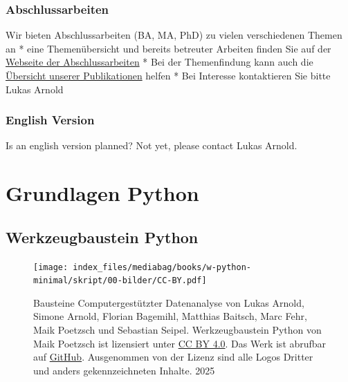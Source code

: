 \documentclass[
  letterpaper,
  DIV=11,
  numbers=noendperiod]{scrreprt}
\begin{document}
\section*{Abschlussarbeiten}\label{abschlussarbeiten}


Wir bieten Abschlussarbeiten (BA, MA, PhD) zu vielen verschiedenen
Themen an * eine Themenübersicht und bereits betreuter Arbeiten finden
Sie auf der
\href{https://cce.uni-wuppertal.de/de/abschlussarbeiten/}{Webseite der
Abschlussarbeiten} * Bei der Themenfindung kann auch die
\href{https://www.fz-juelich.de/en/ias/ias-7/profiles/arnold-lukas/journal-articles}{Übersicht
unserer Publikationen} helfen * Bei Interesse kontaktieren Sie bitte
Lukas Arnold

\section*{English Version}\label{english-version}


Is an english version planned? Not yet, please contact Lukas Arnold.

\part{Grundlagen Python}

\chapter*{Werkzeugbaustein Python}\label{werkzeugbaustein-python}


\label{Lizenz}
\begin{figure}

\begin{minipage}{0.20\linewidth}
\texttt{[image: index\_files/mediabag/books/w-python-minimal/skript/00-bilder/CC-BY.pdf]}\end{minipage}%
%
\begin{minipage}{0.80\linewidth}
Bausteine Computergestützter Datenanalyse von Lukas Arnold, Simone
Arnold, Florian Bagemihl, Matthias Baitsch, Marc Fehr, Maik Poetzsch und
Sebastian Seipel. Werkzeugbaustein Python von Maik Poetzsch ist
lizensiert unter
\href{https://creativecommons.org/licenses/by/4.0/deed.de}{CC BY 4.0}.
Das Werk ist abrufbar auf
\href{https://github.com/bausteine-der-datenanalyse/w-python}{GitHub}.
Ausgenommen von der Lizenz sind alle Logos Dritter und anders
gekennzeichneten Inhalte. 2025\end{minipage}%

\end{figure}%
\end{document}
